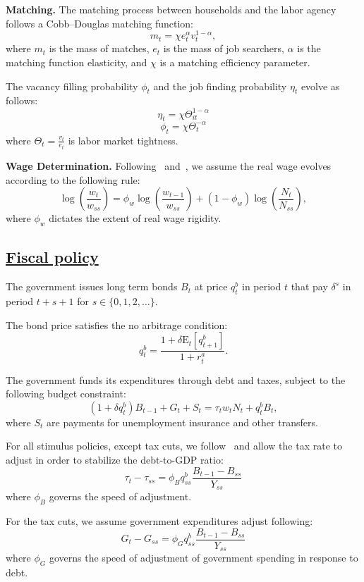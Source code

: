 \documentclass{econsocart}
\begin{document}
\textbf{Matching.} The matching process between households and the labor agency follows a Cobb--Douglas matching function:
\[
  m_{t} = \chi e_{t}^{\alpha} v_{t}^{1-\alpha},
\]
where $m_{t}$ is the mass of matches, $e_{t}$ is the mass of job searchers, $\alpha$ is the matching function elasticity, and $\chi$ is a matching efficiency parameter.

The vacancy filling probability \( \phi_t \) and the job finding probability \( \eta_t \) evolve as follows:
\[
  \eta_{t} = \chi \Theta_{it}^{1-\alpha}
\]
\[
  \phi_{t} = \chi \Theta_{t}^{-\alpha}
\]
where $\Theta_{t} = \frac{v_{t}}{e_{t}}$ is labor market tightness.

\textbf{Wage Determination.} Following~\cite{Gornemann2021} and~\cite{Blanchard2010}, we assume the real wage evolves according to the following rule:
\[
  \log\left(\frac{w_{t}}{w_{ss}}\right)  = \phi_w \log\left( \frac{ w_{t-1}}{ w_{ss}} \right) +   (1 - \phi_w) \log\left( \frac{N_{t}}{N_{ss}}\right),
\]
where $\phi_w$ dictates the extent of real wage rigidity.

\subsection{\href{https://econ-ark.github.io/HAFiscal/\#sec:hank-fiscal-policy}{Fiscal policy}}\whenintegrated{\label{sec:hank-fiscal-policy}}

The government issues long term bonds $B_{t}$ at price $q^{b}_{t}$ in period $t$ that pay $\delta^{s}$ in period $t+s+1$ for $s \in \{0,1,2,\ldots\}$.

The bond price satisfies the no arbitrage condition:
\[
  q^{b}_{t} = \frac{ 1  + \delta \mathrm{E}_{t}[q^{b}_{t+1}]}{1+r^{a}_{t}}.
\]

The government funds its expenditures through debt and taxes, subject to the following budget constraint:
\[
  (1 + \delta q^{b}_{t})B_{t-1} + G_{t}  + S_{t} = \tau_{t} w_{t} N_{t}+ q^{b}_{t}B_{t},
\]
where $S_{t}$ are payments for unemployment insurance and other transfers.

For all stimulus policies, except tax cuts, we follow~\cite{arsJumpsHumps} and allow the tax rate to adjust in order to stabilize the debt-to-GDP ratio:
\[
  \tau_{t} - \tau_{ss} = \phi_{B} q^{b}_{ss} \frac{B_{t-1} - B_{ss} }{Y_{ss}}
\]
where $\phi_{B}$ governs the speed of adjustment.

For the tax cuts, we assume government expenditures adjust following:
\[
  G_{t} - G_{ss} = \phi_{G} q^{b}_{ss} \frac{B_{t-1} - B_{ss} }{Y_{ss}}
\]
where $\phi_{G}$ governs the speed of adjustment of government spending in response to debt.
\end{document}
